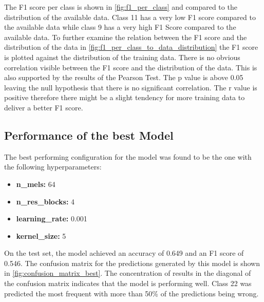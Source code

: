 The F1 score per class is shown in \autoref{fig:f1_per_class} and compared to the distribution
of the available data. Class 11 has a very low F1 score compared to the available data while class 9 has a very high F1 Score
compared to the available data. To further examine the relation between the F1 score and the distribution of the data
in \autoref{fig:f1_per_class_to_data_distribution} the F1 score is plotted against the distribution of the training data.
There is no obvious correlation visible between the F1 score and the distribution of the data. This is also supported by the results
of the Pearson Test. The p value is above 0.05 leaving the null hypothesis that there is no significant correlation. The r value
is positive therefore there might be a slight tendency for more training data to deliver a better F1 score.










\subsection{Performance of the best Model}%

The best performing configuration for the model was found to be the one with the following hyperparameters:

\begin{itemize}
    \item \textbf{n\_mels:} 64
    \item \textbf{n\_res\_blocks:} 4
    \item \textbf{learning\_rate:} 0.001
    \item \textbf{kernel\_size:} 5
\end{itemize}

On the test set, the model achieved an accuracy of 0.649 and an F1 score of 0.546. 
The confusion matrix for the predictions generated by this model is shown in \autoref{fig:confusion_matrix_best}.
The concentration of results in the diagonal of the confusion matrix indicates that the model is performing well.
Class 22 was predicted the most frequent with more than 50\% of the predictions being wrong.


